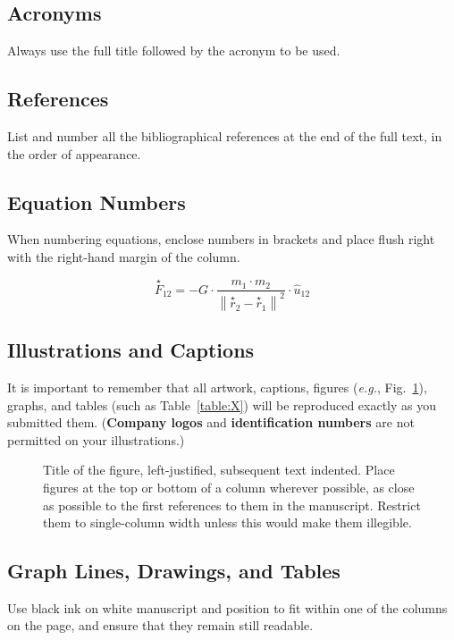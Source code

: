 \documentclass[]{iac}
\begin{document}
\subsection{Acronyms}
Always use the full title followed by the acronym to be used.

\subsection{References}
List and number all the bibliographical references at the end of the full text, in the order of appearance.\cite{IAFSecretariat2014}

\subsection{Equation Numbers}
When numbering equations, enclose numbers in brackets and place flush right with the right-hand margin of the column.

\begin{equation}
\stackrel{\star}{F}_{12} = -G \cdot \frac{ m_1 \cdot m_2 }{ \left\|\stackrel{\star}{r}_2 - \stackrel{\star}{r}_1\right\|^2 } \cdot \hat{u}_{12}
\end{equation}

\subsection{Illustrations and Captions}
It is important to remember that all artwork, captions, figures (\textit{e.g.}, Fig.~\ref{fig:X}), graphs, and tables (such as Table~\ref{table:X}) will be reproduced exactly as you submitted them. (\textbf{Company logos} and \textbf{identification numbers} are not permitted on your illustrations.)

\begin{figure}
\caption{\label{fig:X}Title of the figure, left-justified, subsequent text indented. Place figures at the top or bottom of a column wherever possible, as close as possible to the first references to them in the manuscript. Restrict them to single-column width unless this would make them illegible.} 
\end{figure}

\subsection{Graph Lines, Drawings, and Tables}
Use black ink on white manuscript and position to fit within one of the columns on the page, and ensure that they remain still readable.
\end{document}

